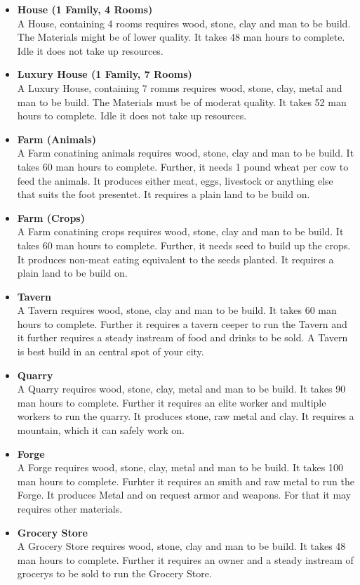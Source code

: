 \begin{itemize}
\item \textbf{House (1 Family, 4 Rooms)} \\ A House, containing 4 rooms requires wood, stone, clay and man to be build. The Materials might be of lower quality. It takes 48 man hours to complete. Idle it does not take up resources.
\item \textbf{Luxury House (1 Family, 7 Rooms)} \\ A Luxury House, containing 7 romms requires wood, stone, clay, metal and man to be build. The Materials must be of moderat quality. It takes 52 man hours to complete. Idle it does not take up resources.
\item \textbf{Farm (Animals)} \\ A Farm conatining animals requires wood, stone, clay and man to be build. It takes 60 man hours to complete. Further, it needs 1 pound wheat per cow to feed the animals. It produces either meat, eggs, livestock or anything else that suits the foot presentet. It requires a plain land to be build on.
\item \textbf{Farm (Crops)} \\ A Farm conatining crops requires wood, stone, clay and man to be build. It takes 60 man hours to complete. Further, it needs seed to build up the crops. It produces non-meat eating equivalent to the seeds planted. It requires a plain land to be build on.
\item \textbf{Tavern} \\ A Tavern requires wood, stone, clay and man to be build. It takes 60 man hours to complete. Further it requires a tavern ceeper to run the Tavern and it further requires a steady instream of food and drinks to be sold. A Tavern is best build in an central spot of your city.
\item \textbf{Quarry} \\ A Quarry requires wood, stone, clay, metal and man to be build. It takes 90 man hours to complete. Further it requires an elite worker and multiple workers to run the quarry. It produces stone, raw metal and clay. It requires a mountain, which it can safely work on.
\item \textbf{Forge} \\ A Forge requires wood, stone, clay, metal and man to be build. It takes 100 man hours to complete. Furhter it requires an smith and raw metal to run the Forge. It produces Metal and on request armor and weapons. For that it may requires other materials.
\item \textbf{Grocery Store} \\ A Grocery Store requires wood, stone, clay and man to be build. It takes 48 man hours to complete. Further it requires an owner and a steady instream of grocerys to be sold to run the Grocery Store.

\end{itemize}
